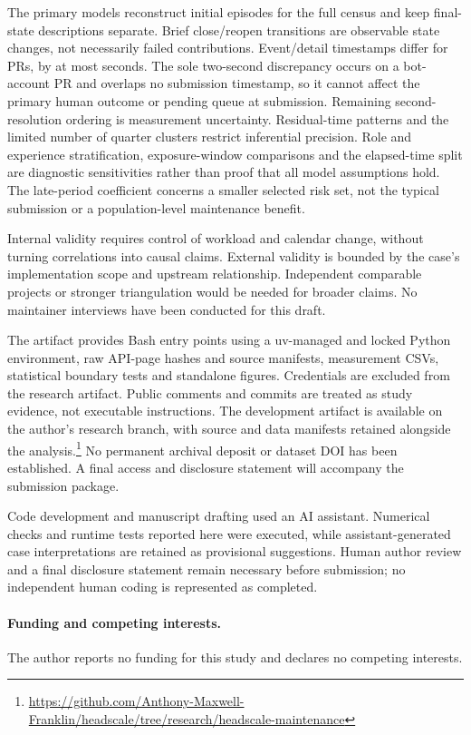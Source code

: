 \documentclass[11pt]{article}
\begin{document}
The primary models reconstruct initial episodes for the full census and keep
final-state descriptions separate. Brief close/reopen transitions are observable
state changes, not necessarily failed contributions. Event/detail timestamps
differ for \ClockDisagreementPRs{} PRs, by at most \ClockMaxDelta{} seconds.
The sole two-second discrepancy occurs on a bot-account PR and overlaps no
submission timestamp, so it cannot affect the primary human outcome or pending
queue at submission. Remaining second-resolution ordering is measurement
uncertainty. Residual-time patterns
and the limited number of quarter clusters restrict inferential precision.
Role and experience stratification, exposure-window comparisons and the elapsed-time
split are diagnostic sensitivities rather than proof that all model assumptions
hold. The late-period coefficient concerns a smaller selected risk set, not the
typical submission or a population-level maintenance benefit.

Internal validity requires control of workload and calendar change, without
turning correlations into causal claims. External validity is bounded by the
case's implementation scope and upstream relationship. Independent comparable
projects or stronger triangulation would be needed for broader claims. No
maintainer interviews have been conducted for this draft.

The artifact provides Bash entry points using a uv-managed and locked Python
environment, raw API-page hashes and source
manifests, measurement CSVs, statistical boundary tests and standalone figures.
Credentials are excluded from the research artifact. Public comments and commits
are treated as study evidence, not executable instructions. The development
artifact is available on the author's research branch, with source and data
manifests retained alongside the analysis.\footnote{\url{https://github.com/Anthony-Maxwell-Franklin/headscale/tree/research/headscale-maintenance}}
No permanent archival deposit or dataset DOI has been established. A final
access and disclosure statement will accompany the submission package.

Code development and manuscript drafting used an AI assistant. Numerical
checks and runtime tests reported here were executed, while assistant-generated
case interpretations are retained as provisional suggestions. Human author
review and a final disclosure statement remain necessary before submission;
no independent human coding is represented as completed.

\paragraph{Funding and competing interests.}
The author reports no funding for this study and declares no competing interests.
\end{document}
